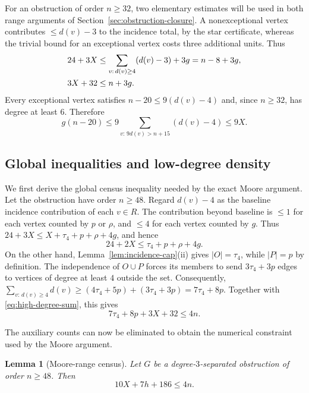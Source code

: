 \documentclass[11pt]{article}
\numberwithin{equation}{section}
\newtheorem{lemma}[theorem]{Lemma}
\theoremstyle{definition}
\theoremstyle{remark}
\begin{document}
For an obstruction of order \(n\ge32\), two elementary estimates will be
used in both range arguments of Section~\ref{sec:obstruction-closure}.  A
nonexceptional vertex contributes
\(\le d(v)-3\) to the incidence total, by the star certificate, whereas the
trivial bound for an exceptional vertex costs three additional units.  Thus
\begin{align}
  24+3X
  &\le\sum_{v:\,d(v)\ge4}(d(v)-3)+3g=n-8+3g,\notag\\
  3X+32&\le n+3g.                    \label{eq:exceptional-hoarding}
\end{align}
Every exceptional vertex satisfies \(n-20\le9(d(v)-4)\) and, since
\(n\ge32\), has degree at least \(6\).  Therefore
\begin{equation}\label{eq:exceptional-giants}
  g(n-20)
  \le9\sum_{v:\,9d(v)>n+15}(d(v)-4)
  \le9X.
\end{equation}

\subsection{Global inequalities and low-degree density}

We first derive the global census inequality needed by the exact Moore
argument.  Let the obstruction have order \(n\ge48\).  Regard \(d(v)-4\) as
the baseline incidence contribution of each \(v\in R\).  The contribution
beyond baseline is \(\le1\) for each vertex counted by \(p\) or \(\rho\),
and \(\le4\) for each vertex counted by \(g\).  Thus
\(24+3X\le X+\tau_4+p+\rho+4g\), and hence
\begin{equation}\label{eq:slots}
  24+2X\le\tau_4+p+\rho+4g.
\end{equation}
On the other hand, Lemma~\ref{lem:incidence-cap}(ii) gives
\(|O|=\tau_4\), while \(|P|=p\) by definition.  The independence of
\(O\cup P\) forces its members to send \(3\tau_4+3p\) edges to vertices of
degree at least \(4\) outside the set.  Consequently,
\(\sum_{v:\,d(v)\ge4}d(v)
\ge(4\tau_4+5p)+(3\tau_4+3p)=7\tau_4+8p\).
Together with \eqref{eq:high-degree-sum}, this gives
\begin{equation}\label{eq:capacity}
  7\tau_4+8p+3X+32\le4n.
\end{equation}

The auxiliary counts can now be eliminated to obtain the numerical
constraint used by the Moore argument.

\begin{lemma}[Moore-range census]\label{lem:moore-census}
Let \(G\) be a degree-\(3\)-separated obstruction of order \(n\ge48\).  Then
\begin{equation}\label{eq:moore-census}
  10X+7h+186\le4n.
\end{equation}
\end{lemma}
\end{document}
